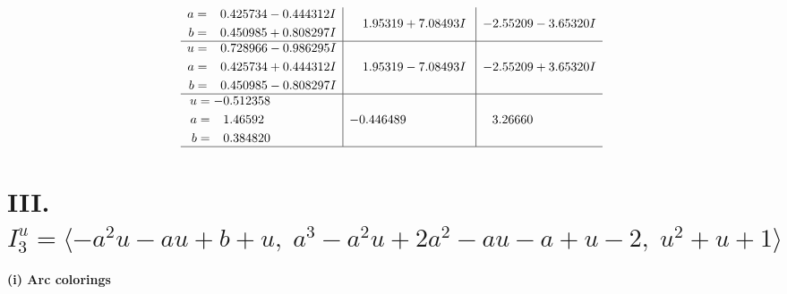 \documentclass[1p]{elsarticle_modified}
\theoremstyle{definition}
\begin{document}
$$\begin{array}{c|c|c}
\begin{aligned}
a &= \phantom{-}0.425734 - 0.444312 I \\
b &= \phantom{-}0.450985 + 0.808297 I\end{aligned}
 & \phantom{-}1.95319 + 7.08493 I & -2.55209 - 3.65320 I \\ \hline\begin{aligned}
u &= \phantom{-}0.728966 - 0.986295 I \\
a &= \phantom{-}0.425734 + 0.444312 I \\
b &= \phantom{-}0.450985 - 0.808297 I\end{aligned}
 & \phantom{-}1.95319 - 7.08493 I & -2.55209 + 3.65320 I \\ \hline\begin{aligned}
u &= -0.512358\phantom{ +0.000000I} \\
a &= \phantom{-}1.46592\phantom{ +0.000000I} \\
b &= \phantom{-}0.384820\phantom{ +0.000000I}\end{aligned}
 & -0.446489\phantom{ +0.000000I} & \phantom{-}3.26660\phantom{ +0.000000I}\\
 \hline 
 \end{array}$$\newpage\newpage\renewcommand{\arraystretch}{1}
\centering \section*{III. $I^u_{3}= \langle - a^2 u- a u+b+u,\;a^3- a^2 u+2 a^2- a u- a+u-2,\;u^2+u+1 \rangle$}
\flushleft \textbf{(i) Arc colorings}\\
\end{document}
